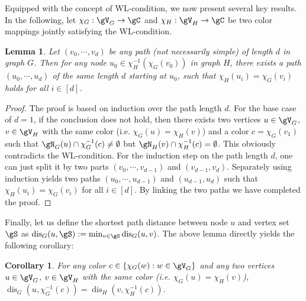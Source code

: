 \documentclass{article} %
\newtheorem{lemma}[theorem]{Lemma}
\newtheorem{corollary}[theorem]{Corollary}
\newcommand*{\dis}{{\operatorname{dis}}}
\begin{document}
Equipped with the concept of WL-condition, we now present several key results. In the following, let $\chi_G:\gV_G\to\gC$ and $\chi_H:\gV_H\to\gC$ be two color mappings jointly satisfying the WL-condition.

\begin{lemma}
\label{thm:wl_condition}
Let $(v_0,\cdots, v_d)$ be any path (not necessarily simple) of length $d$ in graph $G$. Then for any node $u_0\in\chi_H^{-1}(\chi_G(v_0))$ in graph $H$, there exists a path $(u_0,\cdots, u_d)$ of the same length $d$ starting at $u_0$, such that $\chi_H(u_i)=\chi_G(v_i)$ holds for all $i\in[d]$.
\end{lemma}
\begin{proof}
The proof is based on induction over the path length $d$. For the base case of $d=1$, if the conclusion does not hold, then there exists two vertices $u\in\gV_G$, $v\in\gV_H$ with the same color (i.e. $\chi_G(u)=\chi_H(v)$) and a color $c=\chi_G(v_1)$ such that $\gN_G(u)\cap \chi_G^{-1}(c)\neq\emptyset$ but $\gN_H(v)\cap \chi_H^{-1}(c)=\emptyset$. This obviously contradicts the WL-condition. For the induction step on the path length $d$, one can just split it by two parts $(v_0,\cdots,v_{d-1})$ and $(v_{d-1},v_d)$. Separately using induction yields two paths $(u_0,\cdots,u_{d-1})$ and $(u_{d-1},u_d)$ such that $\chi_H(u_i)=\chi_G(v_i)$ for all $i\in[d]$. By linking the two paths we have completed the proof.
\end{proof}
Finally, let us define the shortest path distance between node $u$ and vertex set $\gS$ as $\dis_G(u,\gS):=\min_{v\in\gS}\dis_G(u,v)$. The above lemma directly yields the following corollary:
\begin{corollary}
\label{thm:wl_condition_corollary}
For any color $c\in\{\chi_G(w):w\in\gV_G\}$ and any two vertices $u\in\gV_G$, $v\in\gV_H$ with the same color (i.e. $\chi_G(u)=\chi_H(v)$), $\dis_G(u,\chi_G^{-1}(c))=\dis_H(v,\chi_H^{-1}(c))$.
\end{corollary}
\end{document}
